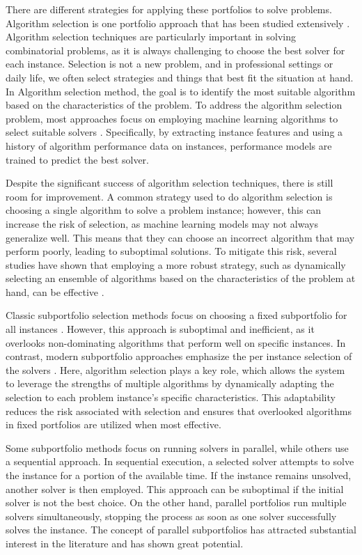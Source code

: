 There are different strategies for applying these portfolios to solve problems. Algorithm selection is one portfolio approach that has been studied extensively \cite{Kotthoff2014,10.1162/evco_a_00242}. Algorithm selection techniques are particularly important in solving combinatorial problems, as it is always challenging to choose the best solver for each instance. Selection is not a new problem, and in professional settings or daily life, we often select strategies and things that best fit the situation at hand. In Algorithm selection method, the goal is to identify the most suitable algorithm based on the characteristics of the problem. To address the algorithm selection problem, most approaches focus on employing machine learning algorithms to select suitable solvers \cite{BISCHL201641}. Specifically, by extracting instance features and using a history of algorithm performance data on instances, performance models are trained to predict the best solver. 

Despite the significant success of algorithm selection techniques, there is still room for improvement. A common strategy used to do algorithm selection is choosing a single algorithm to solve a problem instance; however, this can increase the risk of selection, as machine learning models may not always generalize well. This means that they can choose an incorrect algorithm that may perform poorly, leading to suboptimal solutions. To mitigate this risk, several studies have shown that employing a more robust strategy, such as dynamically selecting an ensemble of algorithms based on the characteristics of the problem at hand, can be effective \cite{3s,satzilla}.

Classic subportfolio selection methods focus on choosing a fixed subportfolio for all instances \cite{ppfolio}. However, this approach is suboptimal and inefficient, as it overlooks non-dominating algorithms that perform well on specific instances. In contrast, modern subportfolio approaches emphasize the per instance selection of the solvers \cite{satzilla,3s}. Here, algorithm selection plays a key role, which allows the system to leverage the strengths of multiple algorithms by dynamically adapting the selection to each problem instance's specific characteristics. This adaptability reduces the risk associated with selection and ensures that overlooked algorithms in fixed portfolios are utilized when most effective.

Some subportfolio methods focus on running solvers in parallel, while others use a sequential approach. In sequential execution, a selected solver attempts to solve the instance for a portion of the available time. If the instance remains unsolved, another solver is then employed. This approach can be suboptimal if the initial solver is not the best choice. On the other hand, parallel portfolios run multiple solvers simultaneously, stopping the process as soon as one solver successfully solves the instance. The concept of parallel subportfolios has attracted substantial interest in the literature and has shown great potential. 

